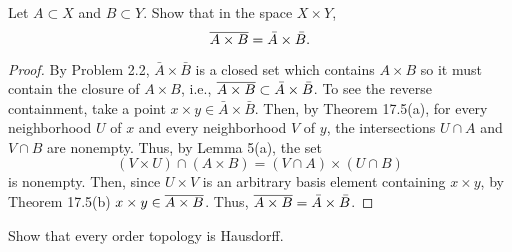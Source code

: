 \newpage
\begin{problem}[Munkres \S17, p.\,101, 9]
Let $A\subset X$ and $B\subset Y$. Show that in the space
$X\times Y$,
\[
\overline{A\times B}=\bar A\times\bar B.
\]
\end{problem}
\begin{proof}
By Problem 2.2, $\bar A\times\bar B$ is a closed set which
contains $A\times B$ so it must contain the closure of $A\times
B$, i.e., $\overline{A\times B}\subset\bar A\times\bar B$. To see the
reverse containment, take a point $x\times y\in\bar A\times\bar
B$. Then, by Theorem 17.5(a), for every neighborhood $U$ of $x$
and every neighborhood $V$ of $y$, the intersections $U\cap A$
and $V\cap B$ are nonempty. Thus, by Lemma 5(a), the set
\[
(V\times U)\cap(A\times B)=(V\cap A)\times (U\cap B)
\]
is nonempty. Then, since $U\times V$ is an arbitrary basis
element containing $x\times y$, by Theorem 17.5(b) $x\times
y\in\overline{A\times B}$. Thus, $\overline{A\times B}=\bar A\times\bar
B$.
\end{proof}
\newpage
\begin{problem}[Munkres \S17, p.\,101, 10]
Show that every order topology is Hausdorff.
\end{problem}
